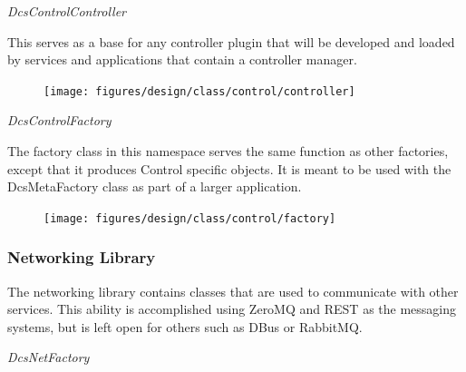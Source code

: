      \emph{DcsControlController}

      \vspace*{-0.75cm}
      \begin{minipage}[t]{0.5\textwidth}
      	\vspace*{0.5cm}
        This serves as a base for any controller plugin that will be developed
        and loaded by services and applications that contain a controller
        manager.
      \end{minipage} \hfill
      \begin{minipage}[t]{0.45\textwidth}
        \begin{figure}[H]
          \texttt{[image: figures/design/class/control/controller]}
          \label{fig:dsg-classes-control-controller}
        \end{figure}
      \end{minipage}

      \emph{DcsControlFactory}

      \vspace*{-0.75cm}
      \begin{minipage}[t]{0.5\textwidth}
      	\vspace*{0.5cm}
        The factory class in this namespace serves the same function as other
        factories, except that it produces Control specific objects. It is
        meant to be used with the DcsMetaFactory class as part of a larger
        application.
      \end{minipage} \hfill
      \begin{minipage}[t]{0.45\textwidth}
        \begin{figure}[H]
          \texttt{[image: figures/design/class/control/factory]}
          \label{fig:dsg-classes-control-factory}
        \end{figure}
      \end{minipage}

    \subsubsection{Networking Library}\label{sec:dsg-classes-net}

      The networking library contains classes that are used to communicate with
      other services. This ability is accomplished using ZeroMQ and REST as the
      messaging systems, but is left open for others such as DBus or RabbitMQ.

      \emph{DcsNetFactory}

